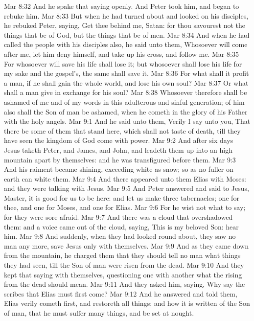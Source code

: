 \vs Mar 8:32 And he spake that saying openly. And Peter took him, and began to rebuke him.
\vs Mar 8:33 But when he had turned about and looked on his disciples, he rebuked Peter, saying, Get thee behind me, Satan: for thou savourest not the things that be of God, but the things that be of men.
\vs Mar 8:34 And when he had called the people  with his disciples also, he said unto them, Whosoever will come after me, let him deny himself, and take up his cross, and follow me.
\vs Mar 8:35 For whosoever will save his life shall lose it; but whosoever shall lose his life for my sake and the gospel's, the same shall save it.
\vs Mar 8:36 For what shall it profit a man, if he shall gain the whole world, and lose his own soul?
\vs Mar 8:37 Or what shall a man give in exchange for his soul?
\vs Mar 8:38 Whosoever therefore shall be ashamed of me and of my words in this adulterous and sinful generation; of him also shall the Son of man be ashamed, when he cometh in the glory of his Father with the holy angels.
\vs Mar 9:1 And he said unto them, Verily I say unto you, That there be some of them that stand here, which shall not taste of death, till they have seen the kingdom of God come with power.
\vs Mar 9:2 And after six days Jesus taketh  Peter, and James, and John, and leadeth them up into an high mountain apart by themselves: and he was transfigured before them.
\vs Mar 9:3 And his raiment became shining, exceeding white as snow; so as no fuller on earth can white them.
\vs Mar 9:4 And there appeared unto them Elias with Moses: and they were talking with Jesus.
\vs Mar 9:5 And Peter answered and said to Jesus, Master, it is good for us to be here: and let us make three tabernacles; one for thee, and one for Moses, and one for Elias.
\vs Mar 9:6 For he wist not what to say; for they were sore afraid.
\vs Mar 9:7 And there was a cloud that overshadowed them: and a voice came out of the cloud, saying, This is my beloved Son: hear him.
\vs Mar 9:8 And suddenly, when they had looked round about, they saw no man any more, save Jesus only with themselves.
\vs Mar 9:9 And as they came down from the mountain, he charged them that they should tell no man what things they had seen, till the Son of man were risen from the dead.
\vs Mar 9:10 And they kept that saying with themselves, questioning one with another what the rising from the dead should mean.
\vs Mar 9:11 And they asked him, saying, Why say the scribes that Elias must first come?
\vs Mar 9:12 And he answered and told them, Elias verily cometh first, and restoreth all things; and how it is written of the Son of man, that he must suffer many things, and be set at nought.
